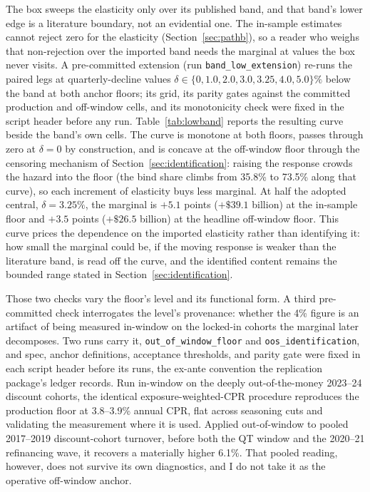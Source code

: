 \documentclass[12pt]{article}
\begin{document}
The box sweeps the elasticity only over its published band, and that band's lower edge is a literature boundary, not an evidential one. The in-sample estimates cannot reject zero for the elasticity (Section~\ref{sec:pathb}), so a reader who weighs that non-rejection over the imported band needs the marginal at values the box never visits. A pre-committed extension (run \texttt{band\_low\_extension}) re-runs the paired legs at quarterly-decline values $\delta \in \{0, 1.0, 2.0, 3.0, 3.25, 4.0, 5.0\}\%$ below the band at both anchor floors; its grid, its parity gates against the committed production and off-window cells, and its monotonicity check were fixed in the script header before any run. Table~\ref{tab:lowband} reports the resulting curve beside the band's own cells. The curve is monotone at both floors, passes through zero at $\delta = 0$ by construction, and is concave at the off-window floor through the censoring mechanism of Section~\ref{sec:identification}: raising the response crowds the hazard into the floor (the bind share climbs from 35.8\% to 73.5\% along that curve), so each increment of elasticity buys less marginal. At half the adopted central, $\delta = 3.25\%$, the marginal is $+5.1$ points ($+\$39.1$ billion) at the in-sample floor and $+3.5$ points ($+\$26.5$ billion) at the headline off-window floor. This curve prices the dependence on the imported elasticity rather than identifying it: how small the marginal could be, if the moving response is weaker than the literature band, is read off the curve, and the identified content remains the bounded range stated in Section~\ref{sec:identification}.


Those two checks vary the floor's level and its functional form. A third pre-committed check interrogates the level's provenance: whether the 4\% figure is an artifact of being measured in-window on the locked-in cohorts the marginal later decomposes. Two runs carry it, \texttt{out\_of\_window\_floor} and \texttt{oos\_identification}, and spec, anchor definitions, acceptance thresholds, and parity gate were fixed in each script header before its runs, the ex-ante convention the replication package's ledger records. Run in-window on the deeply out-of-the-money 2023--24 discount cohorts, the identical exposure-weighted-CPR procedure reproduces the production floor at 3.8--3.9\% annual CPR, flat across seasoning cuts and validating the measurement where it is used. Applied out-of-window to pooled 2017--2019 discount-cohort turnover, before both the QT window and the 2020--21 refinancing wave, it recovers a materially higher 6.1\%. That pooled reading, however, does not survive its own diagnostics, and I do not take it as the operative off-window anchor.
\end{document}
